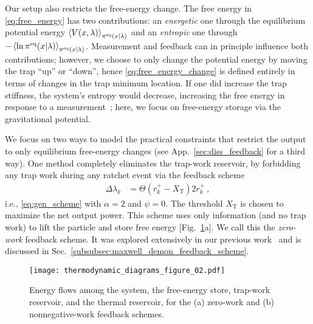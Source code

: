 \documentclass[%
reprint,
bibnotes, amsmath, amssymb, aps, pre,
 showkeys,
floatfix
]{revtex4-2}
\newcommand{\mrm}{\mathrm}
\newcommand{\pr}[1]{\left(#1\right)} %
\newcommand{\dlk}{\Delta\lambda_{k}}
\newcommand{\xkpr}{r_{k}^{+}}
\newcommand{\xT}{X_{\mrm{T}}}
\begin{document}
Our setup also restricts the free-energy change.
The free energy in \eqref{eq:free_energy} has two contributions: an \emph{energetic} one through the equilibrium potential energy $\ev{V(x,\lambda)}_{\pi^{\mrm{eq}}(x|\lambda)}$ and an \emph{entropic} one through $-\ev{\ln \pi^{\mrm{eq}}(x|\lambda)}_{\pi^{\mrm{eq}}(x|\lambda)}$. 
Measurement and feedback can in principle influence both contributions; however, we choose to only change the potential energy by moving the trap ``up'' or ``down'', hence \eqref{eq:free_energy_change} is defined entirely in terms of changes in the trap minimum location. 
If one did increase the trap stiffness, the system's entropy would decrease, increasing the free energy in response to a measurement~\cite{Granger2016, Dinis2021}; here, we focus on free-energy storage via the gravitational potential.

We focus on two ways to model the practical constraints that restrict the output to only equilibrium free-energy changes (see App.~\ref{sec:diss_feedback} for a third way).
One method completely eliminates the trap-work reservoir, by forbidding any trap work during any ratchet event via the feedback scheme
\begin{align}
    \dlk &= \Theta\pr{\xkpr-\xT}2\xkpr \ , \label{eq:pnas_rule}
\end{align}
i.e., \eqref{eq:gen_scheme} with $\alpha=2$ and $\psi=0$.
The threshold $\xT$ is chosen to maximize the net output power.
This scheme uses only information (and no trap work) to lift the particle and store free energy [Fig.~\ref{fig:practical_extraction_diagram}a].
We call this the \emph{zero-work} feedback scheme. 
It was explored extensively in our previous work~\cite{Saha2021} and is discussed in Sec.~\ref{subsubsec:maxwell_demon_feedback_scheme}.

\begin{figure}[htbp]
    \centering
    \texttt{[image: thermodynamic\_diagrams\_figure\_02.pdf]}
    \caption{ 
        Energy flows among the system, the free-energy store, trap-work reservoir, and the thermal reservoir, for the (a) zero-work and (b) nonnegative-work feedback schemes. 
        }
    \label{fig:practical_extraction_diagram}
\end{figure}
\end{document}
